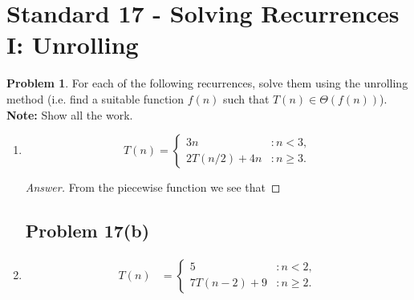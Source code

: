 \documentclass[11pt]{article}
\theoremstyle{definition}
\theoremstyle{definition}
\newtheorem{required}{Problem}
\theoremstyle{definition}
\begin{document}
\newpage
\section{Standard 17 - Solving Recurrences I: Unrolling}

\begin{required} \label{unrolling}
For each of the following recurrences, solve them using the unrolling method (i.e. find a suitable function $f(n)$ such that $T(n) \in \Theta(f(n))$). \textbf{Note: } Show all the work.

\renewcommand{\theenumi}{\alph{enumi}}
\begin{enumerate}
\subsection{Problem 17(a)}
\item 
$$
T(n) = \begin{cases}
3n & : n < 3, \\
2T(n / 2) + 4n & : n \geq 3.
\end{cases}
$$

\begin{proof}[Answer]
From the piecewise function we see that 
\end{proof}


\newpage
\subsection{Problem 17(b)}
\item 
\begin{align*}
T(n) &= \begin{cases} 
5 & : n < 2, \\
7T(n-2) + 9 & : n \geq 2.
\end{cases}
\end{align*}


\end{enumerate}
\end{required}
\end{document}

